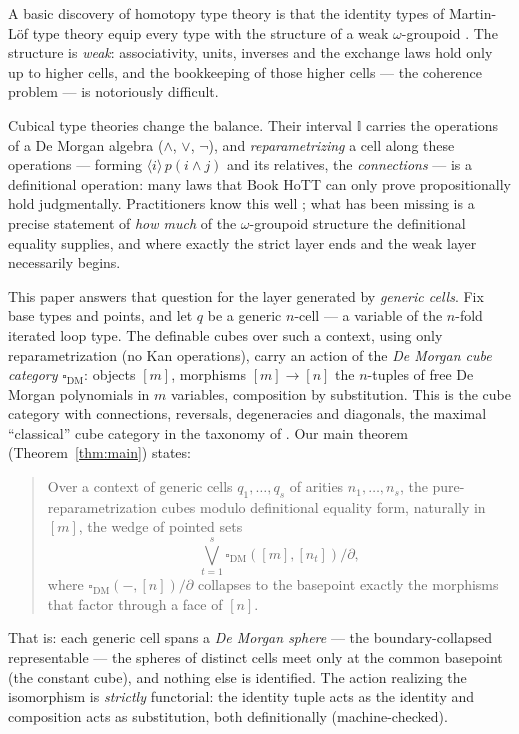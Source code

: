 \documentclass[11pt]{amsart}
\theoremstyle{definition}
\newcommand{\I}{\mathbb{I}}
\newcommand{\Dbox}{\square_{\mathrm{DM}}}
\begin{document}
A basic discovery of homotopy type theory is that the identity types
of Martin-L\"of type theory equip every type with the structure of a
weak $\omega$-groupoid \cite{Lumsdaine,vdBergGarner}.  The structure
is \emph{weak}: associativity, units, inverses and the exchange laws
hold only up to higher cells, and the bookkeeping of those higher
cells --- the coherence problem --- is notoriously difficult.

Cubical type theories \cite{CCHM} change the balance.  Their
interval $\I$ carries the operations of a De Morgan algebra
($\wedge$, $\vee$, $\neg$), and \emph{reparametrizing} a cell along
these operations --- forming $\langle i \rangle\, p(i \wedge j)$ and
its relatives, the \emph{connections} --- is a definitional
operation: many laws that Book HoTT can only prove propositionally
hold judgmentally.  Practitioners know this well
\cite{VezzosiMortbergAbel}; what has been missing is a precise
statement of \emph{how much} of the $\omega$-groupoid structure the
definitional equality supplies, and where exactly the strict layer
ends and the weak layer necessarily begins.

This paper answers that question for the layer generated by
\emph{generic cells}.  Fix base types and points, and let $q$ be a
generic $n$-cell --- a variable of the $n$-fold iterated loop type.
The definable cubes over such a context, using only
reparametrization (no Kan operations), carry an action of the
\emph{De Morgan cube category} $\Dbox$: objects $[m]$, morphisms
$[m] \to [n]$ the $n$-tuples of free De Morgan polynomials in $m$
variables, composition by substitution.  This is the cube category
with connections, reversals, degeneracies and diagonals, the
maximal ``classical'' cube category in the taxonomy of
\cite{GrandisMauri,BuchholtzMorehouse}.  Our main theorem
(Theorem~\ref{thm:main}) states:

\begin{quote}
  Over a context of generic cells $q_1, \dots, q_s$ of arities
  $n_1, \dots, n_s$, the pure-reparametrization cubes modulo
  definitional equality form, naturally in $[m]$, the wedge of
  pointed sets
  \[
    \bigvee_{t=1}^{s} \Dbox([m],[n_t])/\partial ,
  \]
  where $\Dbox(-,[n])/\partial$ collapses to the basepoint exactly
  the morphisms that factor through a face of $[n]$.
\end{quote}

\noindent That is: each generic cell spans a \emph{De Morgan
sphere} --- the boundary-collapsed representable --- the spheres of
distinct cells meet only at the common basepoint (the constant
cube), and nothing else is identified.  The action realizing the
isomorphism is \emph{strictly} functorial: the identity tuple acts
as the identity and composition acts as substitution, both
definitionally (machine-checked).
\end{document}
